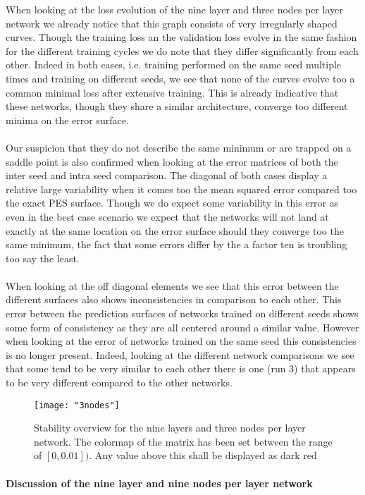 \documentclass[12pt]{article}
\begin{document}
When looking at the loss evolution of the nine layer and three nodes per layer network we already notice that this graph consists of very irregularly shaped curves. Though the training loss an the validation loss evolve in the same fashion for the different training cycles we do note that they differ significantly from each other. Indeed in both cases, i.e. training performed on the same seed multiple times and training on different seeds, we see that none of the curves evolve too a common minimal loss after extensive training. This is already indicative that these networks, though they share a similar architecture, converge too different minima on the error surface.
\\
\\
Our suspicion that they do not describe the same minimum or are trapped on a saddle point is also confirmed when looking at the error matrices of both the inter seed and intra seed comparison. The diagonal of both cases display a relative large variability when it comes too the mean squared error compared too the exact PES surface. Though we do expect some variability in this error as even in the best case scenario we expect that the networks will not land at exactly at the same location on the error surface should they converge too the same minimum, the fact that some errors differ by the a factor ten is troubling too say the least.
\\
\\
When looking at the off diagonal elements we see that this error between the different surfaces also shows inconsistencies in comparison to each other. This error between the prediction surfaces of networks trained on different seeds shows some form of consistency as they are all centered around a similar value. However when looking at the error of networks trained on the same seed this consistencies is no longer present. Indeed, looking at the different network comparisons we see that some tend to be very similar to each other there is one (run 3) that appears to be very different compared to the other networks.

\begin{figure}[H]
	\centering
	\texttt{[image: "3nodes"]}
	\caption{Stability overview for the nine layers and three nodes per layer network. The colormap of the matrix has been set between the range of $\left[0,0.01\right])$. Any value above this shall be displayed as dark red}
\end{figure}

\paragraph{Discussion of the nine layer and nine nodes per layer network}
\end{document}
